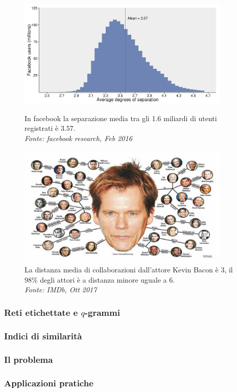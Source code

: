 \begin{frame}
	\begin{figure}[h]
		\centering
		\begin{minipage}[t]{.49\textwidth}
			\centering
			\includegraphics[width=0.9\textwidth]{images/facebook}
			\caption{In facebook la separazione media tra gli 1.6 miliardi di utenti registrati è $3.57$.\\ \textit{Fonte: facebook research, Feb 2016}}
		\end{minipage}\hfill
		\begin{minipage}[t]{.49\textwidth}
			\centering
			\includegraphics[width=0.9\textwidth]{images/2_kevin_bacon}
			\caption{La distanza media di collaborazioni dall'attore Kevin Bacon è $3$, il $98\%$ degli attori è a distanza minore uguale a $6$.\\ \textit{Fonte: IMDb, Ott 2017}}
		\end{minipage}
	\end{figure}
	
\end{frame}

\begin{frame}
	\frametitle{Reti etichettate e $q$-grammi}
	\centering
\end{frame}

\begin{frame}
	\frametitle{Indici di similarità}
	\centering
\end{frame}

\begin{frame}
	\frametitle{Il problema}
	\centering
\end{frame}

\begin{frame}
	\frametitle{Applicazioni pratiche}
	\centering
\end{frame}
